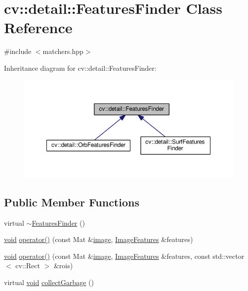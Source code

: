 \hypertarget{classcv_1_1detail_1_1FeaturesFinder}{\section{cv\-:\-:detail\-:\-:Features\-Finder Class Reference}
\label{classcv_1_1detail_1_1FeaturesFinder}
}


{\ttfamily \#include $<$matchers.\-hpp$>$}



Inheritance diagram for cv\-:\-:detail\-:\-:Features\-Finder\-:\nopagebreak
\begin{figure}[H]
\begin{center}
\leavevmode
\includegraphics[width=350pt]{classcv_1_1detail_1_1FeaturesFinder__inherit__graph}
\end{center}
\end{figure}
\subsection*{Public Member Functions}
\begin{DoxyCompactItemize}
\item 
virtual \hyperlink{classcv_1_1detail_1_1FeaturesFinder_a5665e513a4e3db92fc3127206f9a66a0}{$\sim$\-Features\-Finder} ()
\item 
\hyperlink{legacy_8hpp_a8bb47f092d473522721002c86c13b94e}{void} \hyperlink{classcv_1_1detail_1_1FeaturesFinder_a028d953e983592bacd2f186ebd9ec146}{operator()} (const Mat \&\hyperlink{legacy_8hpp_ad62b16ab219ae2483e8a3d921c44cc97}{image}, \hyperlink{structcv_1_1detail_1_1ImageFeatures}{Image\-Features} \&features)
\item 
\hyperlink{legacy_8hpp_a8bb47f092d473522721002c86c13b94e}{void} \hyperlink{classcv_1_1detail_1_1FeaturesFinder_a80b61fcace77ef89441da2abeb3072fd}{operator()} (const Mat \&\hyperlink{legacy_8hpp_ad62b16ab219ae2483e8a3d921c44cc97}{image}, \hyperlink{structcv_1_1detail_1_1ImageFeatures}{Image\-Features} \&features, const std\-::vector$<$ cv\-::\-Rect $>$ \&rois)
\item 
virtual \hyperlink{legacy_8hpp_a8bb47f092d473522721002c86c13b94e}{void} \hyperlink{classcv_1_1detail_1_1FeaturesFinder_adb51fd886db491ea004cd3542d43a982}{collect\-Garbage} ()
\end{DoxyCompactItemize}
